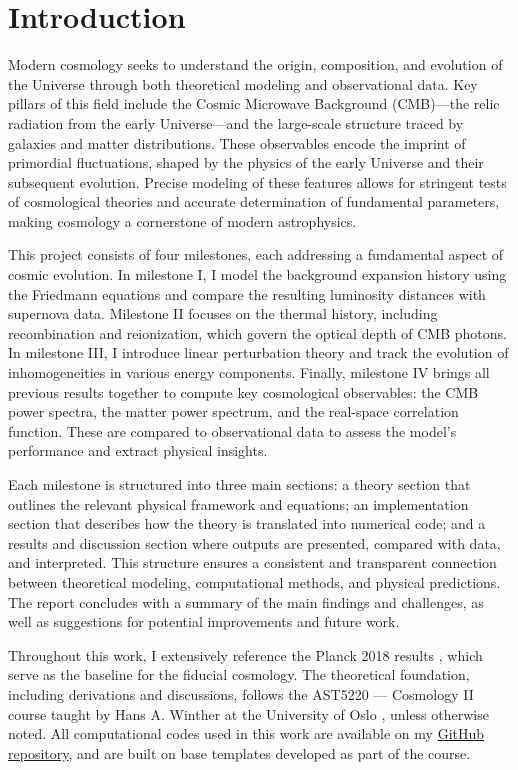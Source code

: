 \documentclass{aa}
\numberwithin{equation}{section}
\numberwithin{table}{section}
\numberwithin{figure}{section}
\begin{document}
\section{Introduction}\label{sec: introduction}
Modern cosmology seeks to understand the origin, composition, and evolution of the Universe through both theoretical modeling and observational data. Key pillars of this field include the Cosmic Microwave Background (CMB)—the relic radiation from the early Universe—and the large-scale structure traced by galaxies and matter distributions. These observables encode the imprint of primordial fluctuations, shaped by the physics of the early Universe and their subsequent evolution. Precise modeling of these features allows for stringent tests of cosmological theories and accurate determination of fundamental parameters, making cosmology a cornerstone of modern astrophysics.

This project consists of four milestones, each addressing a fundamental aspect of cosmic evolution. In milestone I, I model the background expansion history using the Friedmann equations and compare the resulting luminosity distances with supernova data. Milestone II focuses on the thermal history, including recombination and reionization, which govern the optical depth of CMB photons. In milestone III, I introduce linear perturbation theory and track the evolution of inhomogeneities in various energy components. Finally, milestone IV brings all previous results together to compute key cosmological observables: the CMB power spectra, the matter power spectrum, and the real-space correlation function. These are compared to observational data to assess the model's performance and extract physical insights.

Each milestone is structured into three main sections: a theory section that outlines the relevant physical framework and equations; an implementation section that describes how the theory is translated into numerical code; and a results and discussion section where outputs are presented, compared with data, and interpreted. This structure ensures a consistent and transparent connection between theoretical modeling, computational methods, and physical predictions. The report concludes with a summary of the main findings and challenges, as well as suggestions for potential improvements and future work.

Throughout this work, I extensively reference the Planck 2018 results \citep[see][]{Planck}, which serve as the baseline for the fiducial cosmology. The theoretical foundation, including derivations and discussions, follows the AST5220 — Cosmology II course taught by Hans A. Winther at the University of Oslo \citep[see][]{Course}, unless otherwise noted. All computational codes used in this work are available on my \href{https://github.com/paljettrosa/AST5220}{GitHub repository}, and are built on base templates developed as part of the course.
\end{document}
